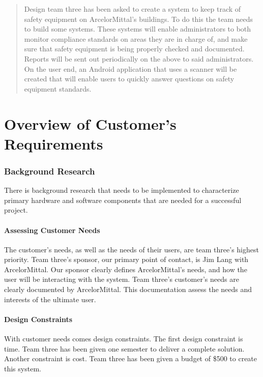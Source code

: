 \documentclass[Letter,11pt]{article}
\begin{document}
	
			\tableofcontents
			\listoffigures
			\begingroup
			\let\clearpage\relax
			\listoftables
			\endgroup
			\newpage	


	\begin{abstract}
		Design team three has been asked to create a system to keep track of safety equipment on ArcelorMittal's buildings. To do this the team needs to build some systems. These systems will enable administrators to both monitor compliance standards on areas they are in charge of, and make sure that safety equipment is being properly checked and documented. Reports will be sent out periodically on the above to said administrators.  On the user end, an Android application  that uses a scanner will be created that will enable users to quickly answer questions on safety equipment standards.

	\end{abstract}
\part{Overview of Customer's Requirements}
\section{Background Research}\label{research}
	There is background research that needs to be implemented to characterize primary hardware and software components that are needed for a successful project. \\
	\subsection{Assessing Customer Needs}\label{custneeds}

	The customer's needs, as well as the needs of their users, are team three's highest priority. Team three's sponsor, our primary point of contact, is Jim Lang with ArcelorMittal. Our sponsor clearly defines ArcelorMittal's needs, and how the user will be interacting with the system. Team three's customer's needs are clearly documented by ArcelorMittal. This documentation assess the needs and interests of the ultimate user. \\ 


	\subsection{Design Constraints}
	With customer needs comes design constraints. The first design constraint is time. Team three has been given one semester to deliver a complete solution. Another constraint is cost. Team three has been given a budget of \$500 to create this system.\\
\end{document}
